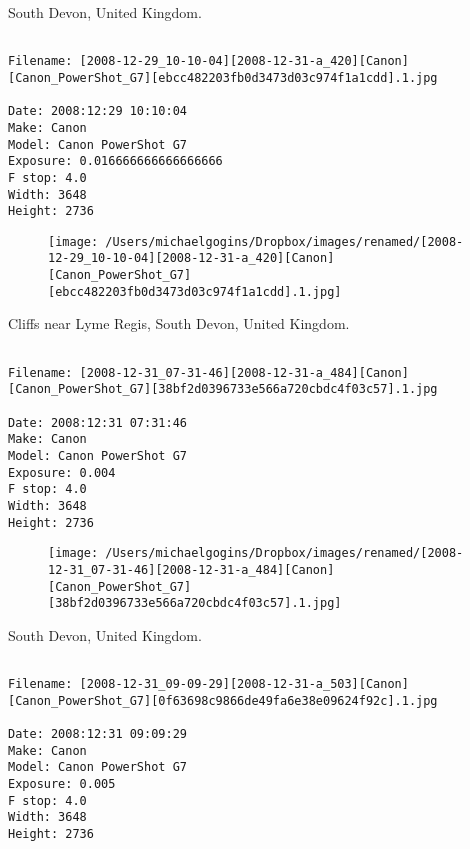 \documentclass[11pt,letter,DIV=14,paper=landscape]{scrbook}
\begin{document}
\clearpage
\noindent South Devon, United Kingdom.
\noindent
\begin{lstlisting}

Filename: [2008-12-29_10-10-04][2008-12-31-a_420][Canon][Canon_PowerShot_G7][ebcc482203fb0d3473d03c974f1a1cdd].1.jpg

Date: 2008:12:29 10:10:04
Make: Canon
Model: Canon PowerShot G7
Exposure: 0.016666666666666666
F stop: 4.0
Width: 3648
Height: 2736
\end{lstlisting}
\clearpage

\begin{figure}
\texttt{[image: /Users/michaelgogins/Dropbox/images/renamed/[2008-12-29\_10-10-04][2008-12-31-a\_420][Canon][Canon\_PowerShot\_G7][ebcc482203fb0d3473d03c974f1a1cdd].1.jpg]}
\end{figure}
    
\clearpage
\noindent Cliffs near Lyme Regis, South Devon, United Kingdom.
\noindent
\begin{lstlisting}

Filename: [2008-12-31_07-31-46][2008-12-31-a_484][Canon][Canon_PowerShot_G7][38bf2d0396733e566a720cbdc4f03c57].1.jpg

Date: 2008:12:31 07:31:46
Make: Canon
Model: Canon PowerShot G7
Exposure: 0.004
F stop: 4.0
Width: 3648
Height: 2736
\end{lstlisting}
\clearpage

\begin{figure}
\texttt{[image: /Users/michaelgogins/Dropbox/images/renamed/[2008-12-31\_07-31-46][2008-12-31-a\_484][Canon][Canon\_PowerShot\_G7][38bf2d0396733e566a720cbdc4f03c57].1.jpg]}
\end{figure}
    
\clearpage
\noindent South Devon, United Kingdom.
\noindent
\begin{lstlisting}

Filename: [2008-12-31_09-09-29][2008-12-31-a_503][Canon][Canon_PowerShot_G7][0f63698c9866de49fa6e38e09624f92c].1.jpg

Date: 2008:12:31 09:09:29
Make: Canon
Model: Canon PowerShot G7
Exposure: 0.005
F stop: 4.0
Width: 3648
Height: 2736
\end{lstlisting}
\clearpage
\end{document}
